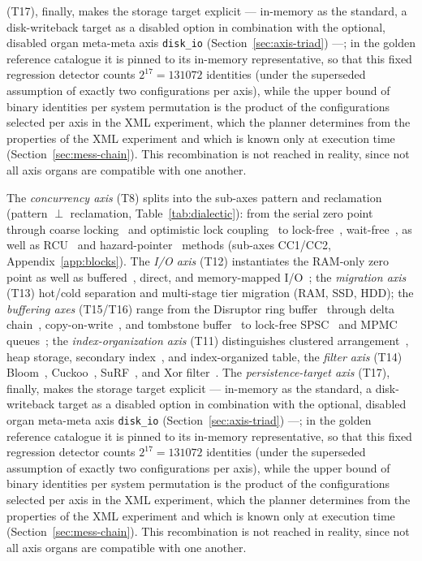 \begin{nurlang}
(T17), finally, makes the storage target explicit --- in-memory as the standard, a
disk-writeback target as a disabled option in combination with the optional, disabled
organ meta-meta axis \texttt{disk\_io} (Section~\ref{sec:axis-triad}) ---; in the golden reference catalogue
it is pinned to its in-memory representative, so that this fixed regression detector counts $2^{17} = 131072$
identities (under the superseded assumption of exactly two configurations per axis), while the upper bound of
binary identities per system permutation is the product of the configurations selected per axis in the XML
experiment, which the planner determines from the properties of the XML experiment and which is known only at
execution time (Section~\ref{sec:mess-chain}). This recombination is not reached in
reality, since not all axis organs are compatible with one another.
\end{nurlang}
\begin{nurkurz}
The \emph{concurrency axis} (T8) splits into the sub-axes pattern and reclamation (pattern $\perp$
reclamation, Table~\ref{tab:dialectic}): from the serial zero point through coarse
locking~\cite{dijkstra1965concurrent} and optimistic lock coupling~\cite{leis2016olc} to
lock-free~\cite{michael1996queue}, wait-free~\cite{herlihy1991waitfree}, as well as
RCU~\cite{mckenney2001rcu} and hazard-pointer~\cite{michael2004hazard} methods (sub-axes CC1/CC2,
Appendix~\ref{app:blocks}). The \emph{I/O axis} (T12) instantiates the RAM-only zero point as well as
buffered~\cite{stonebraker1981os}, direct, and memory-mapped I/O~\cite{crotty2022mmap}; the
\emph{migration axis} (T13) hot/cold separation and multi-stage tier migration (RAM, SSD, HDD); the
\emph{buffering axes} (T15/T16) range from the Disruptor ring buffer~\cite{thompson2011disruptor} through
delta chain~\cite{levandoski2013bwtree}, copy-on-write~\cite{driscoll1989persistent}, and tombstone
buffer~\cite{oneil1996lsm} to lock-free SPSC~\cite{lamport_spsc} and MPMC queues~\cite{michael1996queue};
the \emph{index-organization axis} (T11) distinguishes clustered arrangement~\cite{bayer1972btree}, heap
storage, secondary index~\cite{comer1979btree}, and index-organized table, the \emph{filter axis} (T14)
Bloom~\cite{bloom1970}, Cuckoo~\cite{fan2014cuckoo}, SuRF~\cite{zhang2018surf}, and Xor
filter~\cite{graf2020xor}. The \emph{persistence-target axis} (T17), finally, makes the storage target
explicit --- in-memory as the standard, a disk-writeback target as a disabled option in combination with
the optional, disabled organ meta-meta axis \texttt{disk\_io} (Section~\ref{sec:axis-triad}) ---; in the golden reference catalogue
it is pinned to its in-memory representative, so that this fixed regression detector counts $2^{17} = 131072$
identities (under the superseded assumption of exactly two configurations per axis), while the upper bound of
binary identities per system permutation is the product of the configurations selected per axis in the XML
experiment, which the planner determines from the properties of the XML experiment and which is known only at
execution time (Section~\ref{sec:mess-chain}). This
recombination is not reached in reality, since not all axis organs are compatible with one another.
\end{nurkurz}

